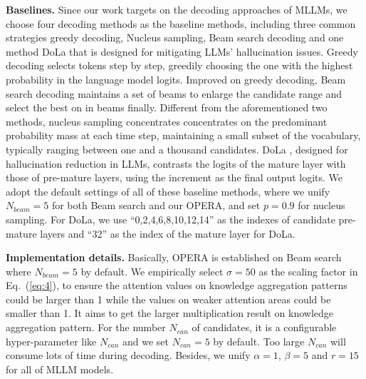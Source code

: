 \documentclass[10pt,twocolumn,letterpaper]{article}
\newcommand{\eref}[1]{Eq.~(\ref{#1})}
\begin{document}
\noindent\textbf{Baselines.} 
Since our work targets on the decoding approaches of MLLMs, we choose four decoding methods as the baseline methods, including three common strategies greedy decoding, Nucleus sampling, Beam search decoding and one method DoLa that is designed for mitigating LLMs' hallucination issues. 
Greedy decoding selects tokens step by step, greedily choosing the one with the highest probability in the language model logits.
Improved on greedy decoding, Beam search decoding \cite{graves2012sequence,sutskever2014sequence,boulanger2013audio} maintains a set of beams to enlarge the candidate range and select the best on in beams finally.
Different from the aforementioned two methods, nucleus sampling \cite{holtzman2019curious} concentrates concentrates on the predominant probability mass at each time step, maintaining a small subset of the vocabulary, typically ranging between one and a thousand candidates.
DoLa \cite{chuang2023dola}, designed for hallucination reduction in LLMs, contrasts the logits of the mature layer with those of pre-mature layers, using the increment as the final output logits. 
We adopt the default settings of all of these baseline methods, where we unify $N_{beam}=5$ for both Beam search and our OPERA, and set $p=0.9$ for nucleus sampling.
For DoLa, we use ``0,2,4,6,8,10,12,14'' as the indexes of candidate pre-mature layers and ``32'' as the index of the mature layer for DoLa.

\noindent\textbf{Implementation details.}
Basically, OPERA is established on Beam search where $N_{beam}=5$ by default. 
We empirically select $\sigma=50$ as the scaling factor in \eref{eq:4}, to ensure the attention values on knowledge aggregation patterns could be larger than 1 while the values on weaker attention areas could be smaller than 1. 
It aims to get the larger multiplication result on knowledge aggregation pattern. 
For the number $N_{can}$ of candidates, it is a configurable hyper-parameter like $N_{can}$ and we set $N_{can}=5$ by default. 
Too large $N_{can}$ will consume lots of time during decoding. 
Besides, we unify $\alpha=1$, $\beta=5$ and $r=15$ for all of MLLM models. 
\end{document}
